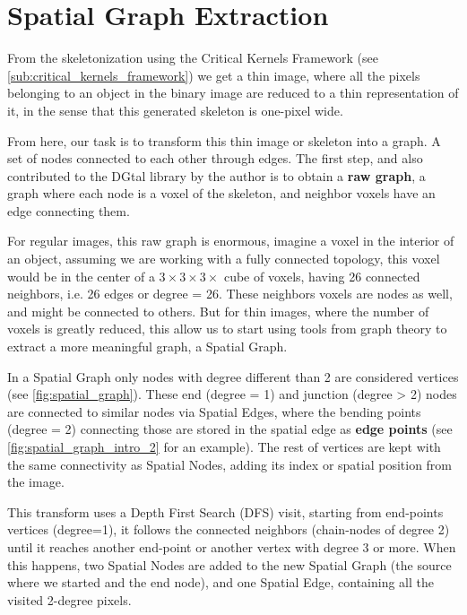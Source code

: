 \section{Spatial Graph Extraction}%
\label{sec:spatial_graph_extraction}

From the skeletonization using the Critical Kernels Framework (see \autoref{sub:critical_kernels_framework}) we get a thin image, where all the pixels belonging to an object in the binary image are reduced to a thin representation of it, in the sense that this generated skeleton is one-pixel wide.

From here, our task is to transform this thin image or skeleton into a \gls{graph}. A set of nodes connected to each other through edges. The first step, and also contributed to the DGtal library by the author is to obtain a \textbf{raw graph}, a graph where each node is a voxel of the skeleton, and neighbor voxels have an edge connecting them.

For regular images, this raw graph is enormous, imagine a voxel in the interior of an object, assuming we are working with a fully connected topology, this voxel would be in the center of a $3\times3\times3\times$ cube of voxels, having 26 connected neighbors, i.e. 26 edges or degree = 26. These neighbors voxels are nodes as well, and might be connected to others.
But for thin images, where the number of voxels is greatly reduced, this allow us to start using tools from graph theory to extract a more meaningful graph, a \gls{Spatial Graph}.

In a \gls{Spatial Graph} only nodes with degree different than 2 are considered vertices (see \autoref{fig:spatial_graph}). These end (degree = 1) and junction (degree > 2) nodes are connected to similar nodes via \glspl{Spatial Edge}, where the bending points (degree = 2) connecting those are stored in the spatial edge as \textbf{edge points} (see \autoref{fig:spatial_graph_intro_2} for an example). The rest of vertices are kept with the same connectivity as \glspl{Spatial Node}, adding its index or spatial position from the image.

This transform uses a Depth First Search (\gls{DFS}) visit, starting from end-points vertices (degree=1), it follows the connected neighbors (chain-nodes of degree 2) until it reaches another end-point or another vertex with degree 3 or more. When this happens, two \glspl{Spatial Node} are added to the new \gls{Spatial Graph} (the source where we started and the end node), and one \gls{Spatial Edge}, containing all the visited 2-degree pixels.

